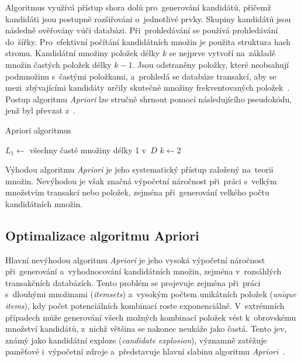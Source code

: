 Algoritmus využívá přístup shora dolů pro~generování kandidátů, přičemž kandidáti jsou postupně rozšiřováni o~jednotlivé prvky. Skupiny kandidátů jsou následně ověřovány vůči databázi. Při~prohledávání se používá prohledávání do~šířky. Pro~efektivní počítání kandidátních množin je použita struktura hash stromu. Kandidátní množiny položek délky \(k\) se nejprve vytvoří na~základě množin častých položek délky \(k - 1\). Jsou odstraněny položky, které neobsahují podmnožinu s~častými položkami, a~prohledá se databáze transakcí, aby se mezi~zbývajícími kandidáty určily skutečné množiny frekventovaných položek~\cite{Agrawal1994}. Postup algoritmu \textit{Apriori} lze stručně shrnout pomocí následujícího pseudokódu, jenž byl převzat z~\cite{Agrawal1994}.

\begin{algorithm}[H]
\caption{Apriori algoritmus}
$L_1 \gets$ všechny časté množiny délky 1 v~$D$\;
$k \gets 2$\;
\;
\end{algorithm}

Výhodou algoritmu \textit{Apriori} je jeho systematický přístup založený na~teorii množin. 
Nevýhodou je však značná výpočetní náročnost při~práci s~velkým množstvím transakcí nebo položek, zejména při~generování velkého počtu kandidátních množin.

\subsection{Optimalizace algoritmu Apriori}
\label{subssec:optiApriori}
Hlavní nevýhodou algoritmu \textit{Apriori} je jeho vysoká výpočetní náročnost při~generování a~vyhodnocování kandidátních množin, zejména v~rozsáhlých transakčních databázích. Tento problém se projevuje zejména při~práci s~dlouhými množinami (\textit{itemsets}) a~vysokým počtem unikátních položek (\textit{unique items}), kdy počet potenciálních kombinací roste exponenciálně. V~extrémních případech může generování všech možných kombinací položek vést k~obrovskému množství kandidátů, z~nichž většina se nakonec neukáže jako častá. Tento jev, známý jako kandidátní exploze (\textit{candidate explosion}), významně zatěžuje paměťové i~výpočetní zdroje a~představuje hlavní slabinu algoritmu \textit{Apriori}~\cite{Agrawal1994}.


